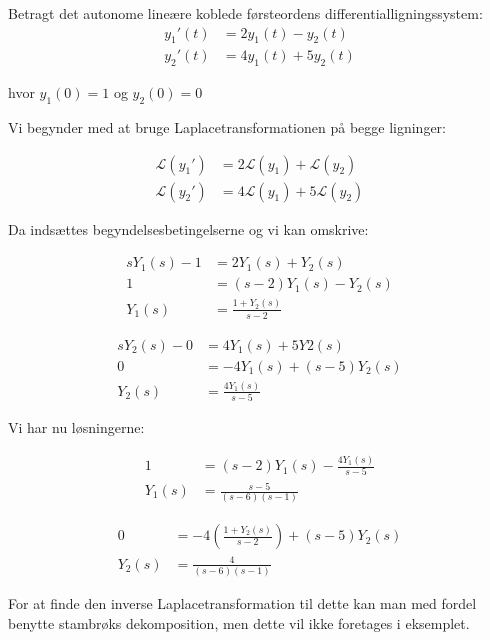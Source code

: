 \begin{Example}\textnormal{
\hfill \break
Betragt det autonome lineære koblede førsteordens differentialligningssystem:}
\begin{align*}
    y_1'(t) &= 2y_1(t)-y_2(t)\\
    y_2'(t) &= 4y_1(t)+5y_2(t)
\end{align*}

\textnormal{hvor $y_1(0)=1$ og $y_2(0)=0$}
\hfill \break

\textnormal{Vi begynder med at bruge Laplacetransformationen på begge ligninger:}

\begin{align*}
\mathcal{L}(y_1') &=2\mathcal{L}(y_1)+\mathcal{L}(y_2) \\
\mathcal{L}(y_2') &=4\mathcal{L}(y_1)+5\mathcal{L}(y_2)
\end{align*}

\textnormal{Da indsættes begyndelsesbetingelserne og vi kan omskrive:}

\begin{align*}
    sY_1(s)-1 &= 2Y_1(s) + Y_2(s) \\
    1 &= (s-2)Y_1(s) - Y_2(s) \\
    Y_1(s) &= \frac{1+Y_2(s)}{s-2}
\end{align*}

\begin{align*}
    sY_2(s)-0 &= 4Y_1(s) + 5Y2(s) \\
    0 &= -4Y_1(s)+(s-5)Y_2(s) \\
    Y_2(s) &= \frac{4Y_1(s)}{s-5}
\end{align*}

\textnormal{Vi har nu løsningerne:}

\begin{align*}
    1 &= (s-2)Y_1(s) - \frac{4Y_1(s)}{s-5} \\
    Y_1(s) &= \frac{s-5}{(s-6)(s-1)}
\end{align*}

\begin{align*}
    0 &= -4 \left( \frac{1+Y_2(s)}{s-2}\right) +(s-5)Y_2(s) \\
    Y_2(s) &= \frac{4}{(s-6)(s-1)}
\end{align*}

\textnormal{For at finde den inverse Laplacetransformation til dette kan man med fordel benytte stambrøks dekomposition, men dette vil ikke foretages i eksemplet.}

\end{Example}
